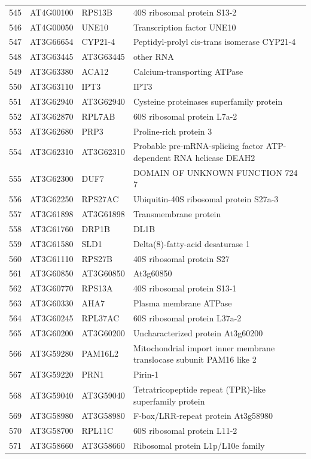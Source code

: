 \documentclass[11pt]{article}
\begin{document}
\begin{center}
\begin{tabular}{rlll}
545 & AT4G00100 & RPS13B & 40S ribosomal protein S13-2\\
546 & AT4G00050 & UNE10 & Transcription factor UNE10\\
547 & AT3G66654 & CYP21-4 & Peptidyl-prolyl cis-trans isomerase CYP21-4\\
548 & AT3G63445 & AT3G63445 & other RNA\\
549 & AT3G63380 & ACA12 & Calcium-transporting ATPase\\
550 & AT3G63110 & IPT3 & IPT3\\
551 & AT3G62940 & AT3G62940 & Cysteine proteinases superfamily protein\\
552 & AT3G62870 & RPL7AB & 60S ribosomal protein L7a-2\\
553 & AT3G62680 & PRP3 & Proline-rich protein 3\\
554 & AT3G62310 & AT3G62310 & Probable pre-mRNA-splicing factor ATP-dependent RNA helicase DEAH2\\
555 & AT3G62300 & DUF7 & DOMAIN OF UNKNOWN FUNCTION 724 7\\
556 & AT3G62250 & RPS27AC & Ubiquitin-40S ribosomal protein S27a-3\\
557 & AT3G61898 & AT3G61898 & Transmembrane protein\\
558 & AT3G61760 & DRP1B & DL1B\\
559 & AT3G61580 & SLD1 & Delta(8)-fatty-acid desaturase 1\\
560 & AT3G61110 & RPS27B & 40S ribosomal protein S27\\
561 & AT3G60850 & AT3G60850 & At3g60850\\
562 & AT3G60770 & RPS13A & 40S ribosomal protein S13-1\\
563 & AT3G60330 & AHA7 & Plasma membrane ATPase\\
564 & AT3G60245 & RPL37AC & 60S ribosomal protein L37a-2\\
565 & AT3G60200 & AT3G60200 & Uncharacterized protein At3g60200\\
566 & AT3G59280 & PAM16L2 & Mitochondrial import inner membrane translocase subunit PAM16 like 2\\
567 & AT3G59220 & PRN1 & Pirin-1\\
568 & AT3G59040 & AT3G59040 & Tetratricopeptide repeat (TPR)-like superfamily protein\\
569 & AT3G58980 & AT3G58980 & F-box/LRR-repeat protein At3g58980\\
570 & AT3G58700 & RPL11C & 60S ribosomal protein L11-2\\
571 & AT3G58660 & AT3G58660 & Ribosomal protein L1p/L10e family\\

\end{tabular}
\end{center}
\end{document}
